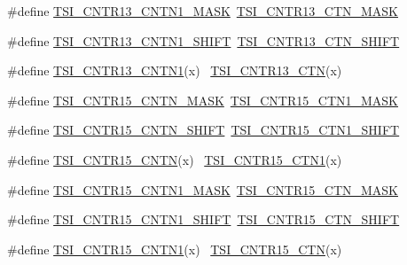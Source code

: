 \begin{DoxyCompactItemize}
\item 
\#define \hyperlink{group___backward___compatibility___symbols_gaf4a380771ea66bd3fcdc13bbd45a17da}{T\+S\+I\+\_\+\+C\+N\+T\+R13\+\_\+\+C\+N\+T\+N1\+\_\+\+M\+A\+SK}~\hyperlink{group___t_s_i___register___masks_gac4b6ed4489dd39029223b49be774965a}{T\+S\+I\+\_\+\+C\+N\+T\+R13\+\_\+\+C\+T\+N\+\_\+\+M\+A\+SK}
\item 
\#define \hyperlink{group___backward___compatibility___symbols_gab607013034255dcfa6529c0e4e59683a}{T\+S\+I\+\_\+\+C\+N\+T\+R13\+\_\+\+C\+N\+T\+N1\+\_\+\+S\+H\+I\+FT}~\hyperlink{group___t_s_i___register___masks_gaffd92baf7411ffdc73289bcf96764e3a}{T\+S\+I\+\_\+\+C\+N\+T\+R13\+\_\+\+C\+T\+N\+\_\+\+S\+H\+I\+FT}
\item 
\#define \hyperlink{group___backward___compatibility___symbols_ga57da922713bdffae5211836cab9880d7}{T\+S\+I\+\_\+\+C\+N\+T\+R13\+\_\+\+C\+N\+T\+N1}(x)                                        ~\hyperlink{group___t_s_i___register___masks_ga2501cf6e6a26ae480b270ae90da03716}{T\+S\+I\+\_\+\+C\+N\+T\+R13\+\_\+\+C\+TN}(x)
\item 
\#define \hyperlink{group___backward___compatibility___symbols_ga8925dd22c3b058610ee9ab2967a9e23d}{T\+S\+I\+\_\+\+C\+N\+T\+R15\+\_\+\+C\+N\+T\+N\+\_\+\+M\+A\+SK}~\hyperlink{group___t_s_i___register___masks_gaa249fbc86511094b5b4ea1cfdff064d1}{T\+S\+I\+\_\+\+C\+N\+T\+R15\+\_\+\+C\+T\+N1\+\_\+\+M\+A\+SK}
\item 
\#define \hyperlink{group___backward___compatibility___symbols_ga2ed1d6b4cd1037afeb6419333d6271af}{T\+S\+I\+\_\+\+C\+N\+T\+R15\+\_\+\+C\+N\+T\+N\+\_\+\+S\+H\+I\+FT}~\hyperlink{group___t_s_i___register___masks_ga7938e4586802c6fa57e4d0145b36aa70}{T\+S\+I\+\_\+\+C\+N\+T\+R15\+\_\+\+C\+T\+N1\+\_\+\+S\+H\+I\+FT}
\item 
\#define \hyperlink{group___backward___compatibility___symbols_gabe28e5612aa86c2c57de8160b807853c}{T\+S\+I\+\_\+\+C\+N\+T\+R15\+\_\+\+C\+N\+TN}(x)                                          ~\hyperlink{group___t_s_i___register___masks_ga9ec01214a1e4b6c4f0d7fe19718a32e1}{T\+S\+I\+\_\+\+C\+N\+T\+R15\+\_\+\+C\+T\+N1}(x)
\item 
\#define \hyperlink{group___backward___compatibility___symbols_ga3b83c839fd79b35f54a2dae8b61ca860}{T\+S\+I\+\_\+\+C\+N\+T\+R15\+\_\+\+C\+N\+T\+N1\+\_\+\+M\+A\+SK}~\hyperlink{group___t_s_i___register___masks_ga35c1646ad39bdaa79f196bf3feb17c57}{T\+S\+I\+\_\+\+C\+N\+T\+R15\+\_\+\+C\+T\+N\+\_\+\+M\+A\+SK}
\item 
\#define \hyperlink{group___backward___compatibility___symbols_ga7711904a938d2cee0fdc00fc4d486726}{T\+S\+I\+\_\+\+C\+N\+T\+R15\+\_\+\+C\+N\+T\+N1\+\_\+\+S\+H\+I\+FT}~\hyperlink{group___t_s_i___register___masks_ga78cfe2a84b08fb470251a3f7b5ff4596}{T\+S\+I\+\_\+\+C\+N\+T\+R15\+\_\+\+C\+T\+N\+\_\+\+S\+H\+I\+FT}
\item 
\#define \hyperlink{group___backward___compatibility___symbols_ga7090adc6a4a5e161ab9c05f30b5ab33c}{T\+S\+I\+\_\+\+C\+N\+T\+R15\+\_\+\+C\+N\+T\+N1}(x)                                        ~\hyperlink{group___t_s_i___register___masks_gabdb8510f1ed62f131dccfc0a027a6ef8}{T\+S\+I\+\_\+\+C\+N\+T\+R15\+\_\+\+C\+TN}(x)
\end{DoxyCompactItemize}


